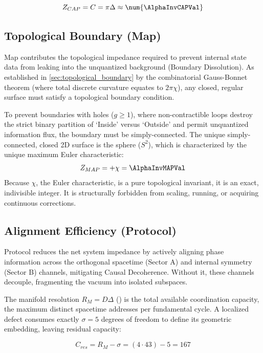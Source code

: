 \begin{equation}
    Z_{CAP} = C = \pi\Delta \approx \num{\AlphaInvCAPVal}
\end{equation}

\subsection{Topological Boundary (Map)}
\label{subsec:alpha_map}
Map contributes the topological impedance required to prevent internal state data from leaking into the unquantized background (Boundary Dissolution). As established in \cref{sec:topological_boundary} by the combinatorial Gauss-Bonnet theorem (where total discrete curvature equates to $2\pi\chi$), any closed, regular surface must satisfy a topological boundary condition. 

To prevent boundaries with holes ($g \ge 1$), where non-contractible loops destroy the strict binary partition of `Inside' versus `Outside' and permit unquantized information flux, the boundary must be simply-connected. The unique simply-connected, closed 2D surface is the sphere ($S^2$), which is characterized by the unique maximum Euler characteristic:
\begin{equation}
    Z_{MAP} = +\chi = \AlphaInvMAPVal
\end{equation}
Because $\chi$, the Euler characteristic, is a pure topological invariant, it is an exact, indivisible integer. It is structurally forbidden from scaling, running, or acquiring continuous corrections.

\subsection{Alignment Efficiency (Protocol)}
\label{subsec:alpha_pro}
Protocol reduces the net system impedance by actively aligning phase information across the orthogonal spacetime (Sector A) and internal symmetry (Sector B) channels, mitigating Causal Decoherence. Without it, these channels decouple, fragmenting the vacuum into isolated subspaces.

The manifold resolution $R_M = D\Delta$ () is the total available coordination capacity, the maximum distinct spacetime addresses per fundamental cycle. A localized defect consumes exactly $\sigma = 5$ degrees of freedom to define its geometric embedding, leaving residual capacity:

\begin{equation}
    C_{res} = R_M - \sigma = (4 \cdot 43) - 5 = 167
\end{equation}

